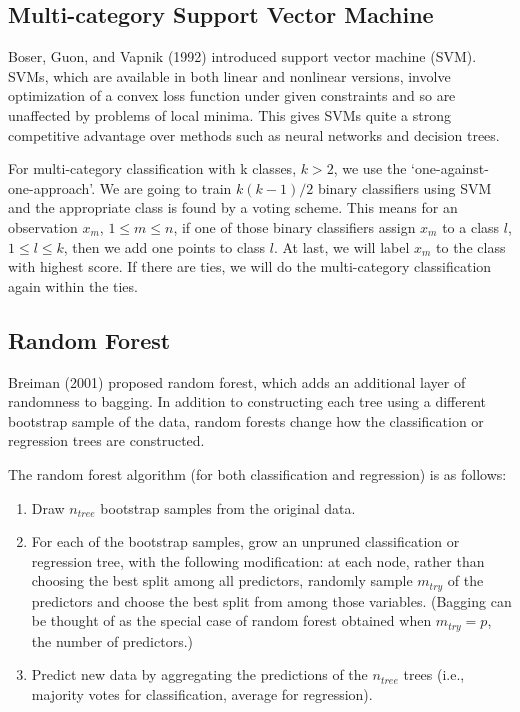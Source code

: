\documentclass[conference]{IEEEtran}
\begin{document}
\subsection{Multi-category Support Vector Machine}
Boser, Guon, and Vapnik (1992) introduced support vector machine (SVM). SVMs, which are available in both linear and nonlinear versions, involve optimization of a convex loss function under given constraints and so are unaffected by problems of local minima. This gives SVMs quite a strong competitive advantage over methods such as neural networks and decision trees.

For multi-category classification with k classes, $k>2$, we use the `one-against-one-approach'. We are going to train $k(k-1)/2$ binary classifiers using SVM and the appropriate class is found by a voting scheme. This means for an observation $x_m$, $1\leq m \leq n$, if one of those binary classifiers assign $x_m$ to a class $l$, $1 \leq l \leq k$, then we add one points to class $l$. At last, we will label $x_m$ to the class with highest score. If there are ties, we will do the multi-category classification again within the ties.

\subsection{Random Forest}
Breiman (2001) proposed random forest, which adds an additional layer of randomness to bagging. In addition to constructing each tree using a different bootstrap sample of the data, random forests change how the classification or regression trees are constructed.

The random forest algorithm (for both classification and regression) is as follows:
\begin{enumerate}
\item Draw $n_{tree}$ bootstrap samples from the original data.
\item For each of the bootstrap samples, grow an unpruned classification or regression tree, with the following modification: at each node, rather than choosing the best split among all predictors, randomly sample $m_{try}$ of the predictors and choose the best split from among those variables. (Bagging can be thought of as the special case of random forest obtained when $m_{try} = p$, the number of predictors.)
\item Predict new data by aggregating the predictions of the $n_{tree}$ trees (i.e., majority votes for classification, average for regression).
\end{enumerate}
\end{document}
